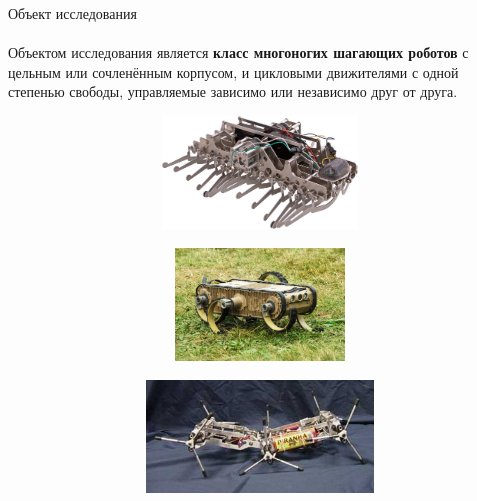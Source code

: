 \documentclass[aspectratio=169,xcolor=table,10pt]{beamer}
\begin{document}
\begin{frame}[t]{Объект исследования}
    \framesubtitle{}
    Объектом исследования является \textbf{класс многоногих шагающих роботов} с цельным или сочленённым корпусом, и цикловыми движителями с одной степенью свободы, управляемые зависимо или независимо друг от друга.

    \begin{figure}[H]
        \begin{subfigure}{0.32\textwidth}
            \centering\includegraphics[height=3cm,width=1\textwidth,keepaspectratio]{from_master/gakken.jpg}
            \label{fig:from_master/gakken.jpg}
        \end{subfigure}
        \begin{subfigure}{0.32\textwidth}
            \centering\includegraphics[height=3cm,width=1\textwidth,keepaspectratio]{from_master/rhex.jpg}
            \label{fig:from_master/rhex.jpg}
        \end{subfigure}
        \begin{subfigure}{0.32\textwidth}
            \centering\includegraphics[height=3cm,width=1\textwidth,keepaspectratio]{from_master/whegs2.jpg}
            \label{fig:from_master/whegs2.jpg}
        \end{subfigure}
    \end{figure}
\end{frame}
\end{document}
